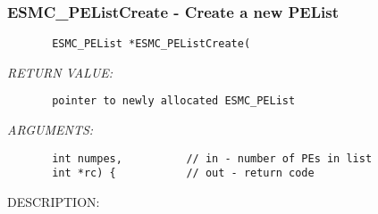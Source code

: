  
\parskip        0pt
\parindent      0pt
\baselineskip  11pt
 
\def\bv{\begin{verbatim}}
\def\ev{\end{verbatim}}
\def\be{\begin{equation}}
\def\ee{\end{equation}}
\def\bea{\begin{eqnarray}}
\def\eea{\end{eqnarray}}
\def\bi{\begin{itemize}}
\def\ei{\end{itemize}}
\def\bn{\begin{enumerate}}
\def\en{\end{enumerate}}
\def\bd{\begin{description}}
\def\ed{\end{description}}
\def\({\left (}
\def\){\right )}
\def\[{\left [}
\def\]{\right ]}
\def\<{\left  \langle}
\def\>{\right \rangle}
\def\cI{{\cal I}}
\def\diag{\mathop{\rm diag}}
\def\tr{\mathop{\rm tr}}


 
\subsubsection{ESMC\_PEListCreate - Create a new PEList}


  
\begin{verbatim}       ESMC_PEList *ESMC_PEListCreate(\end{verbatim}{\em RETURN VALUE:}
\begin{verbatim}       pointer to newly allocated ESMC_PEList\end{verbatim}{\em ARGUMENTS:}
\begin{verbatim}       int numpes,          // in - number of PEs in list
       int *rc) {           // out - return code\end{verbatim}
{\sf DESCRIPTION:\\ }


